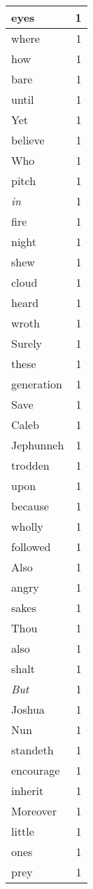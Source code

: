 \begin{center}
\begin{longtable}{l|r}
eyes & 1 \\ \hline
where & 1 \\ \hline
how & 1 \\ \hline
bare & 1 \\ \hline
until & 1 \\ \hline
Yet & 1 \\ \hline
believe & 1 \\ \hline
Who & 1 \\ \hline
pitch & 1 \\ \hline
\emph{in} & 1 \\ \hline
fire & 1 \\ \hline
night & 1 \\ \hline
shew & 1 \\ \hline
cloud & 1 \\ \hline
heard & 1 \\ \hline
wroth & 1 \\ \hline
Surely & 1 \\ \hline
these & 1 \\ \hline
generation & 1 \\ \hline
Save & 1 \\ \hline
Caleb & 1 \\ \hline
Jephunneh & 1 \\ \hline
trodden & 1 \\ \hline
upon & 1 \\ \hline
because & 1 \\ \hline
wholly & 1 \\ \hline
followed & 1 \\ \hline
Also & 1 \\ \hline
angry & 1 \\ \hline
sakes & 1 \\ \hline
Thou & 1 \\ \hline
also & 1 \\ \hline
shalt & 1 \\ \hline
\emph{But} & 1 \\ \hline
Joshua & 1 \\ \hline
Nun & 1 \\ \hline
standeth & 1 \\ \hline
encourage & 1 \\ \hline
inherit & 1 \\ \hline
Moreover & 1 \\ \hline
little & 1 \\ \hline
ones & 1 \\ \hline
prey & 1 \\ \hline

\end{longtable}
\end{center}
